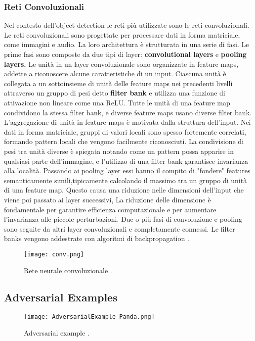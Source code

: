 \subsubsection{Reti Convoluzionali}
Nel contesto dell'object-detection le reti più utilizzate sono le reti convoluzionali. Le reti convoluzionali sono  progettate per processare dati in forma 
matriciale, come immagini e audio. La loro architettura è strutturata in una serie di fasi. Le prime fasi sono composte da due tipi di layer: \textbf{convolutional layers}
e \textbf{pooling layers.}
Le unità in un layer convoluzionale sono organizzate in feature maps, addette a riconoscere alcune caratteristiche di un input. Ciascuna unità è collegata
a un sottoinsieme di unità delle feature maps nei precedenti livelli attraverso un gruppo di pesi detto \textbf{filter bank} e utilizza una funzione di attivazione non lineare come una ReLU. Tutte le unità di una feature map condividono 
la stessa filter bank, e diverse feature maps usano diverse filter bank. L'aggregazione di unità in feature maps è motivata dalla struttura dell'input. Nei dati in forma matriciale, gruppi di valori locali sono spesso fortemente correlati,
formando pattern locali che vengono facilmente riconosciuti. La condivisione di pesi tra unità  diverse è spiegata notando come un pattern possa apparire in qualsiasi parte dell'immagine, e l'utilizzo di una filter bank garantisce invarianza alla località.
Passando ai pooling layer essi hanno il compito di "fondere" features semanticamente simili,tipicamente calcolando il massimo tra un gruppo di unità di una feature map. Questo causa una riduzione nelle dimensioni dell'input che viene poi passato
ai layer successivi, La riduzione delle dimensione è fondamentale per garantire efficienza computazionale e per aumentare l'invarianza alle piccole perturbazioni.
Due o più fasi di convoluzione e pooling sono seguite da altri layer convoluzionali e completamente connessi. Le filter banks vengono addestrate con algoritmi di backpropagation \cite{deep}.
\begin{figure}[h]
  \texttt{[image: conv.png]}
  \caption{Rete neurale convoluzionale \cite{cnn}.}
  \label{fig:conv}
\end{figure} 

\subsection{Adversarial Examples}
\begin{figure}[h]
  \texttt{[image: AdversarialExample\_Panda.png]}
  \caption{Adversarial example \cite{art2018}.}
  \label{fig:adv}
\end{figure}

